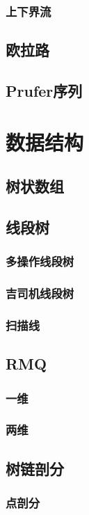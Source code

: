 \documentclass[twocolumn,a4]{article}
\newcommand{\addcpp}[1]{}
\begin{document}
		\subsubsection{上下界流}
	\subsection{欧拉路}
	\subsection{Prufer序列}

\section{数据结构}
	\subsection{树状数组}
	\subsection{线段树}
		\subsubsection{多操作线段树}
		\subsubsection{吉司机线段树}
			\addcpp{datastruct/minSeg}
		\subsubsection{扫描线}
	\subsection{RMQ}
		\subsubsection{一维}
		\subsubsection{两维}
	\subsection{树链剖分}
		\subsubsection{点剖分}
\end{document}
